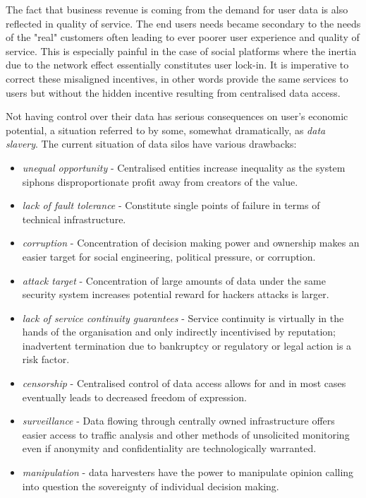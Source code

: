 The fact that business revenue is coming from the demand for user data is also reflected in quality of service. The end users needs became secondary to the needs of the "real" customers often leading to ever poorer user experience and quality of service. This is especially painful in the case of social platforms where the inertia due to the network effect essentially constitutes user lock-in. It is imperative to correct these misaligned incentives, in other words provide the same services to users but without the hidden incentive resulting from centralised data access.

Not having control over their data has serious consequences on user's economic potential, a situation referred to by some, somewhat dramatically, as \emph{data slavery}. 
The current situation of data silos have various drawbacks: 

\begin{itemize}
    \item \emph{unequal opportunity} - Centralised entities increase inequality as the system siphons disproportionate profit away from creators of the value.
    \item \emph{lack of fault tolerance} - Constitute single points of failure in terms of technical infrastructure.
    \item \emph{corruption} - Concentration of decision making power and ownership makes an easier target for social engineering, political pressure, or corruption. 
    \item \emph{attack target} - Concentration of large amounts of data under the same security system increases potential reward for hackers attacks is larger. 
    \item \emph{lack of service continuity guarantees} - Service continuity is virtually in the hands of the organisation and only indirectly incentivised by reputation; inadvertent termination due to bankruptcy or regulatory or legal action is a risk factor.
    \item \emph{censorship} - Centralised control of data access allows for and in most cases eventually leads to decreased freedom of expression.
    \item \emph{surveillance} - Data flowing through centrally owned infrastructure offers easier access to traffic analysis and other methods of unsolicited monitoring even if anonymity and confidentiality are technologically warranted.
    \item \emph{manipulation} - data harvesters have the power to manipulate opinion calling into question the sovereignty of individual decision making.
\end{itemize}

